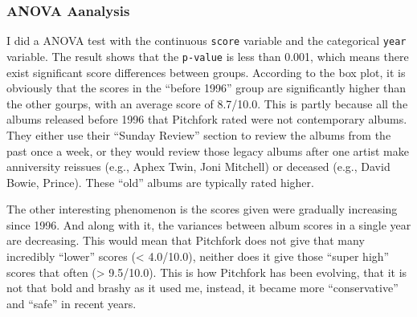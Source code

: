 \documentclass[
]{article}
\begin{document}
\subsubsection{ANOVA Aanalysis}\label{anova-aanalysis}

I did a ANOVA test with the continuous \texttt{score} variable and the
categorical \texttt{year} variable. The result shows that the
\texttt{p-value} is less than 0.001, which means there exist significant
score differences between groups. According to the box plot, it is
obviously that the scores in the ``before 1996'' group are significantly
higher than the other gourps, with an average score of 8.7/10.0. This is
partly because all the albums released before 1996 that Pitchfork rated
were not contemporary albums. They either use their ``Sunday Review''
section to review the albums from the past once a week, or they would
review those legacy albums after one artist make anniversity reissues
(e.g., Aphex Twin, Joni Mitchell) or deceased (e.g., David Bowie,
Prince). These ``old'' albums are typically rated higher.

The other interesting phenomenon is the scores given were gradually
increasing since 1996. And along with it, the variances between album
scores in a single year are decreasing. This would mean that Pitchfork
does not give that many incredibly ``lower'' scores (\textless{}
4.0/10.0), neither does it give those ``super high'' scores that often
(\textgreater{} 9.5/10.0). This is how Pitchfork has been evolving, that
it is not that bold and brashy as it used me, instead, it became more
``conservative'' and ``safe'' in recent years.
\end{document}
